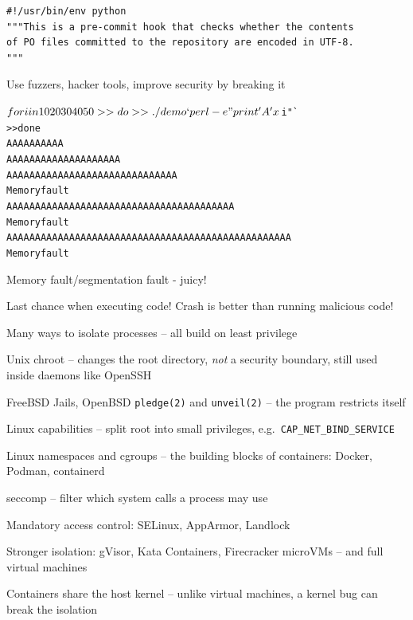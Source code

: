 \documentclass[Screen16to9,17pt]{foils}
\begin{document}

\begin{verbatim}
#!/usr/bin/env python
"""This is a pre-commit hook that checks whether the contents
of PO files committed to the repository are encoded in UTF-8.
"""
\end{verbatim}

{\small {}}





\centerline{Use fuzzers, hacker tools, improve security by breaking it}



\begin{alltt}
$ for i in 10 20 30 40 50
>> do
>> ./demo `perl -e "print 'A'x$i"`
>> done
AAAAAAAAAA
AAAAAAAAAAAAAAAAAAAA
AAAAAAAAAAAAAAAAAAAAAAAAAAAAAA
Memory fault
AAAAAAAAAAAAAAAAAAAAAAAAAAAAAAAAAAAAAAAA
Memory fault
AAAAAAAAAAAAAAAAAAAAAAAAAAAAAAAAAAAAAAAAAAAAAAAAAA
Memory fault
\end{alltt}

\centerline{Memory fault/segmentation fault - juicy!}





\centerline{Last chance when executing code! Crash is better than running malicious code!}


\begin{list1}
\item Many ways to isolate processes -- all build on least privilege
\begin{list2}
\item Unix chroot -- changes the root directory, \emph{not} a security boundary, still used inside daemons like OpenSSH
\item FreeBSD Jails, OpenBSD \verb+pledge(2)+ and \verb+unveil(2)+ -- the program restricts itself
\item Linux capabilities -- split root into small privileges, e.g.\ \verb+CAP_NET_BIND_SERVICE+
\item Linux namespaces and cgroups -- the building blocks of containers: Docker, Podman, containerd
\item seccomp -- filter which system calls a process may use
\item Mandatory access control: SELinux, AppArmor, Landlock
\item Stronger isolation: gVisor, Kata Containers, Firecracker microVMs -- and full virtual machines
\end{list2}
\item Containers share the host kernel -- unlike virtual machines, a kernel bug can break the isolation
\end{list1}
\end{document}
